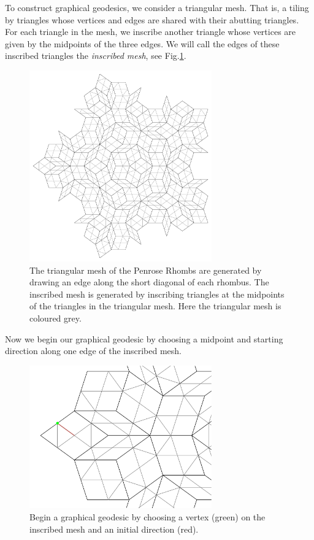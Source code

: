 \documentclass[
  oneside,
  11pt, a4paper,
  footinclude=true,
  headinclude=true,
  cleardoublepage=empty
]{scrbook}
\begin{document}
To construct graphical geodesics, we consider a triangular mesh. That is, a tiling by triangles whose vertices and edges are shared with their abutting triangles. For each triangle in the mesh, we inscribe another triangle whose vertices are given by the midpoints of the three edges. We will call the edges of these inscribed triangles the \textit{inscribed mesh}, see Fig.\ref{fig:inscribedmesh}.
\begin{figure}[H]
\centering
\includegraphics[width=0.7\textwidth]{InscribedMesh}
\caption[Inscribed Mesh]{The triangular mesh of the Penrose Rhombs are generated by drawing an edge along the short diagonal of each rhombus. The inscribed mesh is generated by inscribing triangles at the midpoints of the triangles in the triangular mesh. Here the triangular mesh is coloured grey.}
\label{fig:inscribedmesh}
\end{figure}
Now we begin our graphical geodesic by choosing a midpoint and starting direction along one edge of the inscribed mesh. 
\begin{figure}[H]
\centering
\includegraphics[width=0.7\textwidth]{FirstStep}
\caption[First Step of Geodesic]{Begin a graphical geodesic by choosing a vertex (green) on the inscribed mesh and an initial direction (red).}
\label{fig:startstep}
\end{figure}
\end{document}

